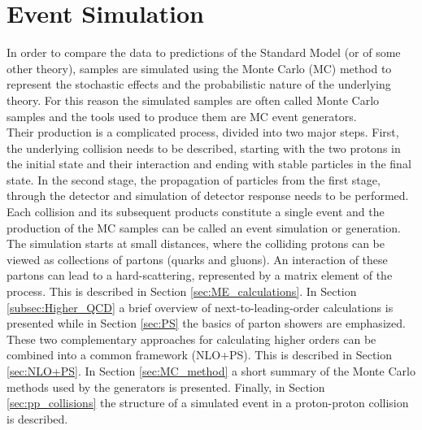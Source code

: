 \cleardoublepage%

\chapter{\label{chap:gen}Event Simulation}%

\noindent In order to compare the data to predictions of the Standard Model (or of some other theory), samples are simulated using the Monte Carlo (MC) method to represent the stochastic effects and the probabilistic nature of the underlying theory. For this reason the simulated samples are often called Monte Carlo samples and the tools used to produce them are MC event generators.\\
\indent Their production is a complicated process, divided into two major steps. First, the underlying collision needs to be described, starting with the two protons in the initial state and their interaction and ending with stable particles in the final state. In the second stage, the propagation of particles from the first stage, through the detector and simulation of detector response needs to be performed. Each collision and its subsequent products constitute a single event and the production of the MC samples can be called an event simulation or generation.\\
\indent The simulation starts at small distances, where the colliding protons can be viewed as collections of partons (quarks and gluons). An interaction of these partons can lead to a hard-scattering, represented by a matrix element of the process. This is described in Section \ref{sec:ME_calculations}. In Section \ref{subsec:Higher_QCD} a brief overview of  next-to-leading-order calculations is presented while in Section \ref{sec:PS} the basics of parton showers are emphasized. These two complementary approaches for calculating higher orders can be combined into a common framework (NLO+PS). This is described in Section \ref{sec:NLO+PS}. In Section \ref{sec:MC_method} a short summary of the Monte Carlo methods used by the generators is presented. Finally, in Section \ref{sec:pp_collisions} the structure of a simulated event in a proton-proton collision is described.



